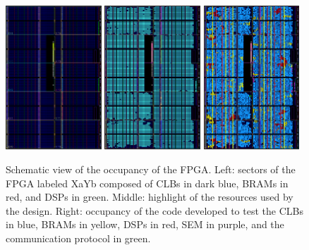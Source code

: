     \begin{figure}
      \centering
      \includegraphics[width=0.32\textwidth]{img/II-5-irradiation/fpga-empty.png}
      \includegraphics[width=0.32\textwidth]{img/II-5-irradiation/fpga-used.png}
      \includegraphics[width=0.32\textwidth]{img/II-5-irradiation/fpga-color.png}
      \caption{Schematic view of the occupancy of the FPGA. Left: sectors of the FPGA labeled XaYb composed of CLBs in dark blue, BRAMs in red, and DSPs in green. Middle: highlight of the resources used by the design. Right: occupancy of the code developed to test the CLBs in blue, BRAMs in yellow, DSPs in red, SEM in purple, and the communication protocol in green.}
      \label{fig:II-5-floorplanning}
    \end{figure}

